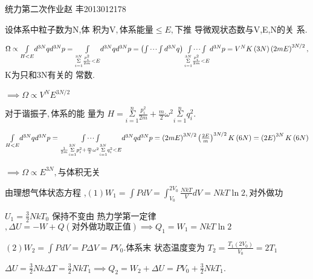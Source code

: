 \documentclass{ctexart}
\begin{document}
统力第二次作业\qquad 赵%
丰2013012178


设体系中粒子数为N,体%
积为V$,$体系能量$\leq E,$下推%
导微观状态数与V,E,N的关%
系$.$

$\Omega \propto \underset{H<E}{\int }d^{3N}qd^{3N}p=\underset{\underset{i=1}{%
\overset{3N}{\Sigma }}\frac{p_{i}^{2}}{2m}<E}{\int }d^{3N}qd^{3N}p=\left(
\idotsint d^{3N}q\right) \underset{\underset{i=1}{\overset{3N}{\Sigma }}%
\frac{p_{i}^{2}}{2m}<E}{\idotsint }d^{3N}p=V^{N}K\left( 3N\right) \left(
2mE\right) ^{3N/2},$K为只和3N有关的%
常数.

$\implies \Omega \propto V^{N}E^{3N/2}$


对于谐振子$,$体系的能%
量为 $H=\underset{i=1}{\overset{n}{\Sigma }}\frac{p_{i}^{2}}{2m}+%
\frac{m}{2}\omega ^{2}\underset{i=1}{\overset{n}{\Sigma }}q_{i}^{2}.$

$\underset{H<E}{\int }d^{3N}qd^{3N}p=\underset{\frac{1}{2m}\underset{i=1}{%
\overset{3N}{\Sigma }}p_{i}^{2}+\frac{m}{2}\omega ^{2}\underset{i=1}{\overset%
{3N}{\Sigma }}q_{i}^{2}<E}{\idotsint }d^{3N}qd^{3N}p=\left( 2mE\right)
^{3N/2}\left( \frac{2E}{m}\right) ^{3N/2}K\left( 6N\right) =\left( 2E\right)
^{3N}K\left( 6N\right) $

$\implies \Omega \propto E^{3N},$与体积无关


由理想气体状态方程%
,\qquad $\left( 1\right) W_{1}=\int PdV=\int_{V_{0}}^{2V_{0}}\frac{NkT}{V}%
dV=NkT\ln 2,$对外做功

$U_{1}=\frac{3}{2}NkT_{0}$ 保持不变\qquad 由%
热力学第一定律$,\Delta
U=-W+Q\left( \text{对外做功取正值}%
\right) \implies Q_{1}=W_{1}=NkT\ln 2$

$\left( 2\right) W_{2}=\int PdV=P\Delta V=PV_{0}.$体系末%
状态温度变为 $T_{2}=\frac{T_{1}\left(
2V_{0}\right) }{V_{0}}=2T_{1}$

$\Delta U=\frac{3}{2}Nk\Delta T=\frac{3}{2}NkT_{1}\implies
Q_{2}=W_{2}+\Delta U=PV_{0}+\frac{3}{2}NkT_{1}.$
\end{document}
